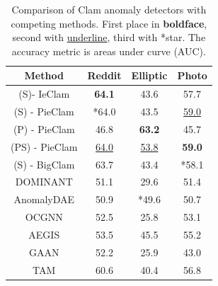 \documentclass{article}
\theoremstyle{plain}
\theoremstyle{definition}
\theoremstyle{remark}
\begin{document}
\begin{table}[t]
\footnotesize
\centering
\begin{tabular}{|c|c|c|c|}
    \hline
  Method  & Reddit& Elliptic& Photo\\
    \hline

(S)- IeClam & \textbf{64.1} & 43.6 & 57.7 \\
(S) - PieClam & *64.0 & 43.5 & \underline{59.0} \\
(P) - PieClam & 46.8 & \textbf{63.2} & 45.7 \\
(PS) - PieClam & \underline{64.0} & \underline{53.8} & \textbf{59.0} \\
(S) - BigClam & 63.7 & 43.4 & *58.1 \\
\hline
DOMINANT & 51.1 & 29.6 & 51.4 \\
AnomalyDAE & 50.9 & *49.6 & 50.7 \\
OCGNN & 52.5 & 25.8 & 53.1 \\
AEGIS & 53.5 & 45.5 & 55.2 \\
GAAN & 52.2 & 25.9 & 43.0 \\
TAM & 60.6 & 40.4 & 56.8 \\
 \hline
\end{tabular}
\caption{Comparison of Clam anomaly detectors with competing methods. %
 First place in \textbf{boldface}, second with \underline{underline}, third with *star. %
 The accuracy metric is areas under curve (AUC).}
\label{Table1}
\end{table}
\end{document}
